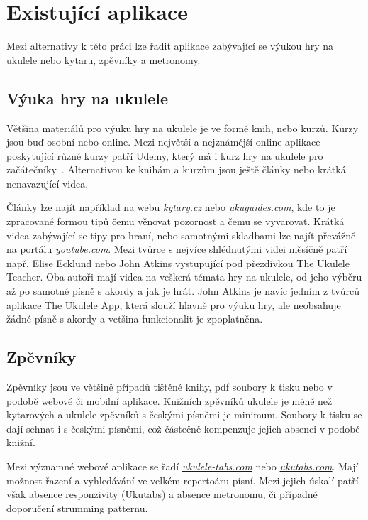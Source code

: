 \section{Existující aplikace}
\label{sc:existing_apps}
Mezi alternativy k této práci lze řadit aplikace zabývající se výukou hry na ukulele nebo kytaru, zpěvníky a metronomy.

\subsection{Výuka hry na ukulele}
\label{ss:existing_teaching_apps}
Většina materiálů pro výuku hry na ukulele je ve formě knih, nebo kurzů.
Kurzy jsou buď osobní nebo online. Mezi největší a nejznámější online aplikace poskytující různé kurzy patří Udemy, který má i kurz hry na ukulele pro začátečníky~\cite{puchmayr_complete}. Alternativou ke knihám a kurzům jsou ještě články nebo krátká nenavazující videa.

Články lze najít například na webu \href{www.kytary.cz}{\emph{kytary.cz}} nebo \href{www.ukuguides.com}{\emph{ukuguides.com}}, kde to je zpracované formou tipů čemu věnovat pozornost a čemu se vyvarovat. Krátká videa zabývající se tipy pro hraní, nebo samotnými skladbami lze najít převážně na portálu \href{www.youtube.com}{\emph{youtube.com}}. Mezi tvůrce s nejvíce shlédnutými videi měsíčně patří např. Elise Ecklund nebo John Atkins vystupující pod přezdívkou The Ukulele Teacher. Oba autoři mají videa na veškerá témata hry na ukulele, od jeho výběru až po samotné písně s akordy a jak je hrát. John Atkins je navíc jedním z tvůrců aplikace The Ukulele App, která slouží hlavně pro výuku hry, ale neobsahuje žádné písně s akordy a vetšina funkcionalit je zpoplatněna.

\subsection{Zpěvníky}
\label{ss:songbooks}
Zpěvníky jsou ve většině případů tištěné knihy, pdf soubory k tisku nebo v podobě webové či mobilní aplikace. Knižních zpěvníků ukulele je méně než kytarových a ukulele zpěvníků s českými písněmi je minimum. Soubory k tisku se dají sehnat i s českými písněmi, což částečně kompenzuje jejich absenci v podobě knižní.

Mezi významné webové aplikace se řadí \href{www.ukulele-tabs.com}{\emph{ukulele-tabs.com}} nebo \href{www.ukutabs.com}{\emph{ukutabs.com}}. Mají možnost řazení a vyhledávání ve velkém repertoáru písní. Mezi jejich úskalí patří však absence responzivity (Ukutabs) a absence metronomu, či případné doporučení strumming patternu.

